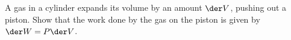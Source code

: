 A gas in a cylinder expands its volume by an amount $\der V$,
pushing out a piston.
Show that the work done by
the gas on the piston is given by  $\der W = P\der V$.
